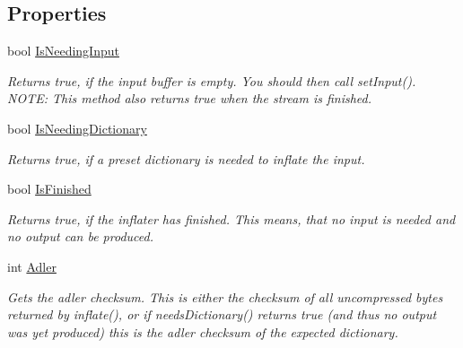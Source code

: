 \subsection*{Properties}
\begin{DoxyCompactItemize}
\item 
bool \hyperlink{class_i_c_sharp_code_1_1_sharp_zip_lib_1_1_zip_1_1_compression_1_1_inflater_a3033837c6e5987009c6bf51c4952a5fc}{Is\+Needing\+Input}
\begin{DoxyCompactList}\small\item\em Returns true, if the input buffer is empty. You should then call set\+Input(). N\+O\+TE\+: This method also returns true when the stream is finished. \end{DoxyCompactList}\item 
bool \hyperlink{class_i_c_sharp_code_1_1_sharp_zip_lib_1_1_zip_1_1_compression_1_1_inflater_a9db69836f41167ffd5e0d1dc5832594c}{Is\+Needing\+Dictionary}
\begin{DoxyCompactList}\small\item\em Returns true, if a preset dictionary is needed to inflate the input. \end{DoxyCompactList}\item 
bool \hyperlink{class_i_c_sharp_code_1_1_sharp_zip_lib_1_1_zip_1_1_compression_1_1_inflater_a0ade6f928ed3c7d1a9c8c9919c98141e}{Is\+Finished}
\begin{DoxyCompactList}\small\item\em Returns true, if the inflater has finished. This means, that no input is needed and no output can be produced. \end{DoxyCompactList}\item 
int \hyperlink{class_i_c_sharp_code_1_1_sharp_zip_lib_1_1_zip_1_1_compression_1_1_inflater_a156a5cb9b6219a84e4e7db12c7e3150e}{Adler}
\begin{DoxyCompactList}\small\item\em Gets the adler checksum. This is either the checksum of all uncompressed bytes returned by inflate(), or if needs\+Dictionary() returns true (and thus no output was yet produced) this is the adler checksum of the expected dictionary. \end{DoxyCompactList}\item 

\end{DoxyCompactItemize}
